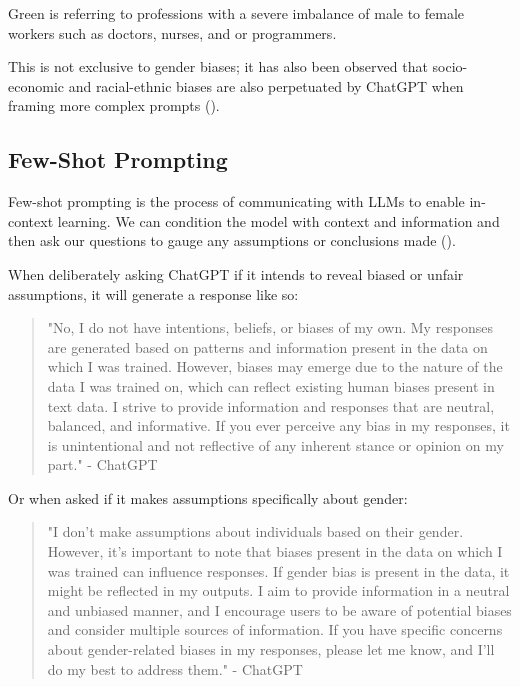 \documentclass[12pt]{article}
\begin{document}
Green is referring to professions with a severe imbalance of male to female workers such as doctors, nurses, and or programmers. 

This is not exclusive to gender biases; it has also been observed that socio-economic and racial-ethnic biases are also perpetuated by ChatGPT when framing more complex prompts (\cite{green-2023}). 

\subsection{Few-Shot Prompting}

Few-shot prompting is the process of communicating with LLMs to enable in-context learning. We can condition the model with context and information and then ask our questions to gauge any assumptions or conclusions made (\cite{yong-2022}). 

When deliberately asking ChatGPT if it intends to reveal biased or unfair assumptions, it will generate a response like so: 

\begin{quote}
    "No, I do not have intentions, beliefs, or biases of my own. My responses are generated based on patterns and information present in the data on which I was trained. However, biases may emerge due to the nature of the data I was trained on, which can reflect existing human biases present in text data. I strive to provide information and responses that are neutral, balanced, and informative. If you ever perceive any bias in my responses, it is unintentional and not reflective of any inherent stance or opinion on my part." - ChatGPT
\end{quote}

Or when asked if it makes assumptions specifically about gender: 

\begin{quote}
    "I don't make assumptions about individuals based on their gender. However, it's important to note that biases present in the data on which I was trained can influence responses. If gender bias is present in the data, it might be reflected in my outputs. I aim to provide information in a neutral and unbiased manner, and I encourage users to be aware of potential biases and consider multiple sources of information. If you have specific concerns about gender-related biases in my responses, please let me know, and I'll do my best to address them." - ChatGPT 
\end{quote}
\end{document}
